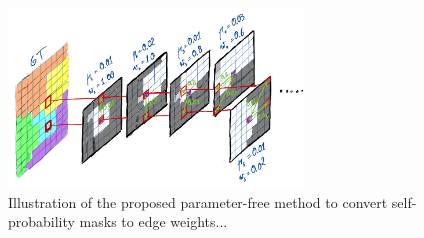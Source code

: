 
\begin{figure}[t]
\centering
        \includegraphics[width=0.7\textwidth]{./figs/alg_explaned.jpg} %
        \caption{Illustration of the proposed parameter-free method to convert self-probability masks to edge weights...}
    \label{fig:alg_explained}
\end{figure}
